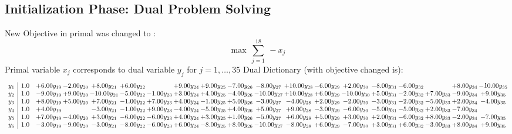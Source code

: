 \documentclass[9pt]{article}
\begin{document}
\subsection{Initialization Phase: Dual Problem Solving}
New Objective in primal was changed to : \[ \max\ \sum_{j=1}^{18}\ - x_j \] 
Primal variable $x_j$ corresponds to dual variable $y_j$ for $j = 1,\ldots,35$
Dual Dictionary (with objective changed is): 
\[\begin{array}{c| c c@{\hskip 2pt} c@{\hskip 2pt} c@{\hskip 2pt} c@{\hskip 2pt} c@{\hskip 2pt} c@{\hskip 2pt} c@{\hskip 2pt} c@{\hskip 2pt} c@{\hskip 2pt} c@{\hskip 2pt} c@{\hskip 2pt} c@{\hskip 2pt} c@{\hskip 2pt} c@{\hskip 2pt} c@{\hskip 2pt} c@{\hskip 2pt} c@{\hskip 2pt} }
 y_{1}   &  1.0 & +  6.00 y_{19} & -2.00 y_{20} & +  8.00 y_{21} & +  6.00 y_{22} &   & +  9.00 y_{24} & +  9.00 y_{25} & -7.00 y_{26} & -8.00 y_{27} & + 10.00 y_{28} & -6.00 y_{29} & +  2.00 y_{30} & -8.00 y_{31} & -6.00 y_{32} &   & +  8.00 y_{34} & -10.00 y_{35}\\
 y_{2}   &  1.0 & -9.00 y_{19} & +  9.00 y_{20} & -10.00 y_{21} & -5.00 y_{22} & -1.00 y_{23} & +  3.00 y_{24} & +  4.00 y_{25} & -4.00 y_{26} & -10.00 y_{27} & + 10.00 y_{28} & +  6.00 y_{29} & -10.00 y_{30} & +  5.00 y_{31} & -2.00 y_{32} & +  7.00 y_{33} & -9.00 y_{34} & +  9.00 y_{35}\\
 y_{3}   &  1.0 & +  8.00 y_{19} & +  5.00 y_{20} & +  7.00 y_{21} & -1.00 y_{22} & +  7.00 y_{23} & +  4.00 y_{24} & -1.00 y_{25} & +  5.00 y_{26} & -3.00 y_{27} & -4.00 y_{28} & +  2.00 y_{29} & -2.00 y_{30} & -3.00 y_{31} & -2.00 y_{32} & -5.00 y_{33} & +  2.00 y_{34} & -4.00 y_{35}\\
 y_{4}   &  1.0 & +  4.00 y_{19} &   & -3.00 y_{21} & -1.00 y_{22} & +  9.00 y_{23} & -4.00 y_{24} & -5.00 y_{25} & +  4.00 y_{26} & +  5.00 y_{27} & +  9.00 y_{28} & -3.00 y_{29} & -6.00 y_{30} & -5.00 y_{31} & -5.00 y_{32} & +  2.00 y_{33} & -7.00 y_{34} &   \\
 y_{5}   &  1.0 & +  7.00 y_{19} & -4.00 y_{20} & +  3.00 y_{21} & -6.00 y_{22} & -6.00 y_{23} & +  4.00 y_{24} & +  3.00 y_{25} & +  1.00 y_{26} & -5.00 y_{27} & +  6.00 y_{28} & +  5.00 y_{29} & +  3.00 y_{30} & +  2.00 y_{31} & -6.00 y_{32} & +  8.00 y_{33} & -2.00 y_{34} & -7.00 y_{35}\\
 y_{6}   &  1.0 & -3.00 y_{19} & -9.00 y_{20} & -3.00 y_{21} & -8.00 y_{22} & -6.00 y_{23} & +  6.00 y_{24} & -8.00 y_{25} & +  8.00 y_{26} & -10.00 y_{27} & -8.00 y_{28} & +  6.00 y_{29} & -7.00 y_{30} & +  3.00 y_{31} & +  6.00 y_{32} & -3.00 y_{33} & +  8.00 y_{34} & +  9.00 y_{35}\\

\end{array}\]
\end{document}
